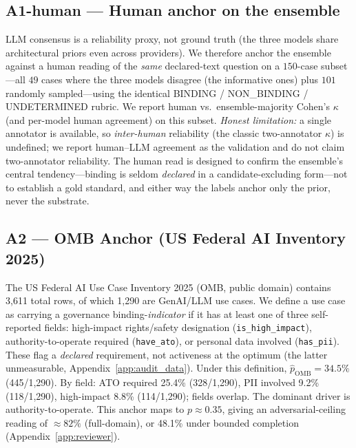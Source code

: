\documentclass{article} %
\begin{document}
\subsection*{A1-human — Human anchor on the ensemble}
LLM consensus is a reliability proxy, not ground truth (the three models share architectural priors even across providers). We therefore anchor the ensemble against a human reading of the \emph{same} declared-text question on a $150$-case subset---all $49$ cases where the three models disagree (the informative ones) plus $101$ randomly sampled---using the identical BINDING / NON\_BINDING / UNDETERMINED rubric. We report human vs.\ ensemble-majority Cohen's $\kappa$ (and per-model human agreement) on this subset. \emph{Honest limitation:} a single annotator is available, so \emph{inter-human} reliability (the classic two-annotator $\kappa$) is undefined; we report human--LLM agreement as the validation and do not claim two-annotator reliability. The human read is designed to confirm the ensemble's central tendency---binding is seldom \emph{declared} in a candidate-excluding form---not to establish a gold standard, and either way the labels anchor only the prior, never the substrate.

\subsection*{A2 — OMB Anchor (US Federal AI Inventory 2025)}
The US Federal AI Use Case Inventory 2025 (OMB, public domain) contains 3{,}611 total rows, of which 1{,}290 are GenAI/LLM use cases.
We define a use case as carrying a governance binding-\emph{indicator} if it has at least one of three self-reported fields: high-impact rights/safety designation (\texttt{is\_high\_impact}), authority-to-operate required (\texttt{have\_ato}), or personal data involved (\texttt{has\_pii}). These flag a \emph{declared} requirement, not activeness at the optimum (the latter unmeasurable, Appendix~\ref{app:audit_data}).
Under this definition, $\hat{p}_{\text{OMB}} = 34.5\%$ (445/1{,}290).
By field: ATO required 25.4\% (328/1{,}290), PII involved 9.2\% (118/1{,}290), high-impact 8.8\% (114/1{,}290); fields overlap.
The dominant driver is authority-to-operate.
This anchor maps to $p \approx 0.35$, giving an adversarial-ceiling reading of $\approx 82\%$ (full-domain), or 48.1\% under bounded completion (Appendix~\ref{app:reviewer}).
\end{document}

